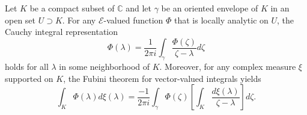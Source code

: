 Let $K$ be a compact subset of $\mathbb{C}$ and let $\gamma$ be an oriented envelope of $K$ in an open set $U \supset K$. For any $\mathcal{E}$-valued function $\Phi$ that is locally analytic on $U$, the Cauchy integral representation
$$\Phi(\lambda) = \frac{1}{2\pi i} \int_{\gamma} \frac{\Phi(\zeta)}{\zeta - \lambda} d\zeta$$
holds for all $\lambda$ in some neighborhood of $K$. Moreover, for any complex measure $\xi$ supported on $K$, the Fubini theorem for vector-valued integrals yields
$$\int_K \Phi(\lambda) d\xi(\lambda) = \frac{-1}{2\pi i} \int_{\gamma} \Phi(\zeta) \left[ \int_K \frac{d\xi(\lambda)}{\zeta - \lambda} \right] d\zeta.$$
